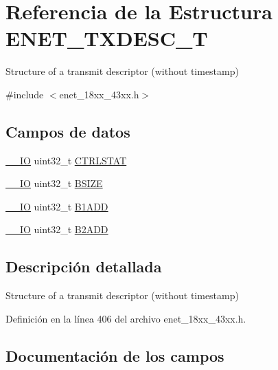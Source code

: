 \hypertarget{struct_e_n_e_t___t_x_d_e_s_c___t}{}\section{Referencia de la Estructura E\+N\+E\+T\+\_\+\+T\+X\+D\+E\+S\+C\+\_\+T}
\label{struct_e_n_e_t___t_x_d_e_s_c___t}


Structure of a transmit descriptor (without timestamp)  




{\ttfamily \#include $<$enet\+\_\+18xx\+\_\+43xx.\+h$>$}

\subsection*{Campos de datos}
\begin{DoxyCompactItemize}
\item 
\hyperlink{core__sc300_8h_aec43007d9998a0a0e01faede4133d6be}{\+\_\+\+\_\+\+IO} uint32\+\_\+t \hyperlink{struct_e_n_e_t___t_x_d_e_s_c___t_a57ef6fedebbfbb6aa9f765be71c15dbb}{C\+T\+R\+L\+S\+T\+AT}
\item 
\hyperlink{core__sc300_8h_aec43007d9998a0a0e01faede4133d6be}{\+\_\+\+\_\+\+IO} uint32\+\_\+t \hyperlink{struct_e_n_e_t___t_x_d_e_s_c___t_af2098998d1719cc4a2e9ba78fb835a90}{B\+S\+I\+ZE}
\item 
\hyperlink{core__sc300_8h_aec43007d9998a0a0e01faede4133d6be}{\+\_\+\+\_\+\+IO} uint32\+\_\+t \hyperlink{struct_e_n_e_t___t_x_d_e_s_c___t_a9b99a80d13d854bce5c3f9646964c34e}{B1\+A\+DD}
\item 
\hyperlink{core__sc300_8h_aec43007d9998a0a0e01faede4133d6be}{\+\_\+\+\_\+\+IO} uint32\+\_\+t \hyperlink{struct_e_n_e_t___t_x_d_e_s_c___t_a3cf5d995cea5c3b42b9224871c5b18a1}{B2\+A\+DD}
\end{DoxyCompactItemize}


\subsection{Descripción detallada}
Structure of a transmit descriptor (without timestamp) 

Definición en la línea 406 del archivo enet\+\_\+18xx\+\_\+43xx.\+h.



\subsection{Documentación de los campos}
